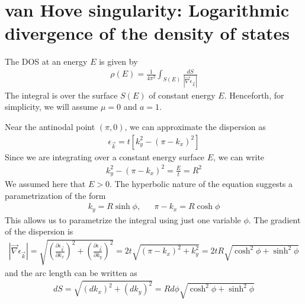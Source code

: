 \documentclass[12pt,onecolumn]{revtex4-2}
\begin{document}
\section{van Hove singularity: Logarithmic divergence of the density of states}
The DOS at an energy $E$ is given by
\begin{equation}\begin{aligned}
	\rho(E) = \frac{1}{4\pi^2}\int_{S(E)} \frac{dS}{|\vec \nabla \epsilon_{\vec{k}}|}
\end{aligned}\end{equation}
The integral is over the surface \(S(E)\) of constant energy $E$. Henceforth, for simplicity, we will assume \(\mu=0\) and \(a=1\). 

Near the antinodal point \(\left(\pi, 0\right) \), we can approximate the dispersion as
\begin{equation}\begin{aligned}
	\epsilon_{\vec k} = t\left[k_y^2 - \left( \pi - k_x \right) ^2\right] 
\end{aligned}\end{equation}
Since we are integrating over a constant energy surface \(E \), we can write
\begin{equation}\begin{aligned}
	k_y^2 - \left( \pi - k_x \right)^2 = \frac{E}{t} = R^2
\end{aligned}\end{equation}
We assumed here that \(E > 0\). The hyperbolic nature of the equation suggests a parametrization of the form
\begin{equation}\begin{aligned}
	k_y = R\sinh \phi, &&\pi - k_x = R\cosh \phi
\end{aligned}\end{equation}
This allows us to parametrize the integral using just one variable \(\phi\). The gradient of the dispersion is
\begin{equation}\begin{aligned}
	|\vec \nabla \epsilon_{\vec{k}}| = \sqrt{\left(\frac{\partial{\epsilon_{\vec k}}}{\partial{k_x}}\right)^2 + \left(\frac{\partial{\epsilon_{\vec k}}}{\partial{k_y}}\right)^2} = 2t\sqrt{\left(\pi - k_x\right)^2 + k_y^2} = 2tR\sqrt{\cosh^2\phi + \sinh^2\phi}
\end{aligned}\end{equation}
and the arc length can be written as
\begin{equation}\begin{aligned}
	dS = \sqrt{(dk_x)^2 + (dk_y)^2} = Rd\phi\sqrt{\cosh^2\phi + \sinh^2\phi}
\end{aligned}\end{equation}
\end{document}
